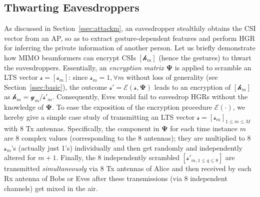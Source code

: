 \documentclass[conference,compsoc]{IEEEtran}
\newcommand{\newrev}[1]{{\color{blue}#1}}    %
\newcommand{\newrev}[1]{#1}
\begin{document}
\subsection{Thwarting Eavesdroppers} \label{ssec:thw-eve}
%
As discussed in Section~\ref{ssec:attackm}, an eavesdropper stealthily obtains the CSI vector from an AP, so as to extract gesture-dependent features and perform HGR for inferring the private information of another person. \newrev{Let us briefly demonstrate how 
MIMO beamformers can encrypt CSIs $[\mathcal{h}_{m}]$ (hence the gestures) to thwart the eavesdroppers. Essentially, 
an \textit{encryption matrix} $\bm{\Psi}$ is applied to scramble an LTS vector $\bm{\mathcal{s}} = [\mathcal{s}_m]$: since $\mathcal{s}_m = 1,\forall m$ without loss of generality (see Section~\ref{ssec:basic}), the outcome $\bm{\mathcal{s}}' = \mathcal{E}(\bm{\mathcal{s}}, \bm{\Psi})$ leads to an encryption of $[\mathcal{h}_{m}]$ as $\mathcal{h}_{m} = \mathcal{y}_{m} / \mathcal{s}'_{m}$.
%
%
Consequently, Eves would fail to eavesdrop HGRs without the knowledge of $\bm{\Psi}$. To ease the exposition of the encryption procedure $\mathcal{E}(\cdot)$, we hereby give a simple case study of transmitting an LTS vector $\bm{\mathcal{s}} = [\mathcal{s}_m]_{1 \le m \le M}$ with 8 Tx antennas.
%
Specifically, the component in $\bm{\Psi}$ for each time instance $m$ are 8 complex values (corresponding to the 8 antennas); they are multiplied to 8 $\mathcal{s}_m$'s (actually just 1's) individually and then get randomly and independently altered for $m+1$.
Finally, the 8 independently scrambled $[\mathcal{s}'_{m, 1 \le q \le 8}]$ are transmitted \textit{simultaneously} via 8 Tx antennas of Alice and then received by each Rx antenna of Bobs or Eves after these transmissions (via 8 independent channels) get mixed in the air.
}
\end{document}
